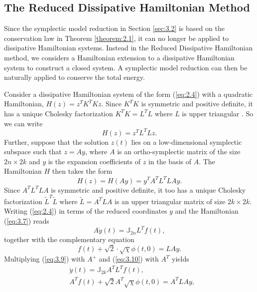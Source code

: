 \subsection{The Reduced Dissipative Hamiltonian Method} \label{sec:3.3}

Since the symplectic model reduction in Section \ref{sec:3.2} is based on the conservation law in Theorem \ref{theorem:2.1}, it can no longer be applied to dissipative Hamiltonian systems. Instead in the Reduced Dissipative Hamiltonian method, we considers a Hamiltonian extension to a dissipative Hamiltonian system to construct a closed system. A symplectic model reduction can then be naturally applied to conserve the total energy.

Consider a dissipative Hamiltonian system of the form (\ref{eq:2.4}) with a quadratic Hamiltonian, $H(z) = z^TK^TKz$. Since $K^TK$ is symmetric and positive definite, it has a unique Cholesky factorization $K^TK = L^T L$ where $L$ is upper triangular \cite{strang09}. So we can write 
\begin{equation} \label{eq:3.7}
H(z) = z^T L^T L z.
\end{equation}
Further, suppose that the solution $z(t)$ lies on a low-dimensional symplectic subspace such that $z = Ay$, where $A$ is an ortho-symplectic matrix of the size $2n\times 2k$ and $y$ is the expansion coefficients of $z$ in the basis of $A$. The Hamiltonian $H$ then takes the form
\begin{equation} \label{eq:3.8}
	H(z) = H(Ay) = y^T A^T L^T L A y.
\end{equation}
Since $A^T L^T L A$ is symmetric and positive definite, it too has a unique Cholesky factorization $\tilde L^T \tilde L$ where $\tilde L = A^T L A$ is an upper triangular matrix of size $2k \times 2k$. Writing (\ref{eq:2.4}) in terms of the reduced coordinates $y$ and the Hamiltonian (\ref{eq:3.7}) reads
\begin{equation} \label{eq:3.9}
		A\dot{y}(t) = \mathbb J_{2n} L^T f(t),
\end{equation}
together with the complementary equation
\begin{equation} \label{eq:3.10}
	f(t) + \sqrt 2 \cdot \sqrt{\chi} \phi(t,0) = LAy.
\end{equation}
Multiplying (\ref{eq:3.9}) with $A^+$ and (\ref{eq:3.10}) with $A^T$ yields
\begin{align} \label{eq:3.11}
	& \dot y(t) = \mathbb J_{2k} A^T L^T f(t), \\
	& A^T f(t) + \sqrt{2} A^T \sqrt{\chi} \phi(t,0) = A^T L A y,
\end{align}
